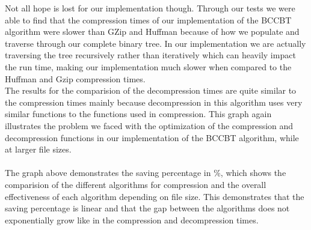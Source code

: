 \documentclass[12pt]{IEEEtran}
\begin{document}
Not all hope is lost for our implementation though.
Through our tests we were able to find that the compression times of our
implementation of the BCCBT algorithm were slower than GZip and Huffman because of how we
populate and traverse through our complete binary tree. In our implementation we are actually traversing the tree recursively rather than
iteratively which can heavily impact the run time, making our implementation much
slower when compared to the Huffman and Gzip compression times.
\\
The results for the comparision of the decompression times are quite similar to the 
compression times mainly because decompression in this algorithm uses very similar functions to the 
functions used in compression. This graph again illustrates the problem we faced with the optimization of
the compression and decompression functions in our implementation of the BCCBT algorithm, while at larger
file sizes.\\
\\
The graph above demonstrates the saving percentage in \%, which shows the 
comparision of the different algorithms for compression and the overall
effectiveness of each algorithm depending on file size. This demonstrates that
the saving percentage is linear and that the gap between the algorithms does not
exponentially grow like in the compression and decompression times.
\end{document}
